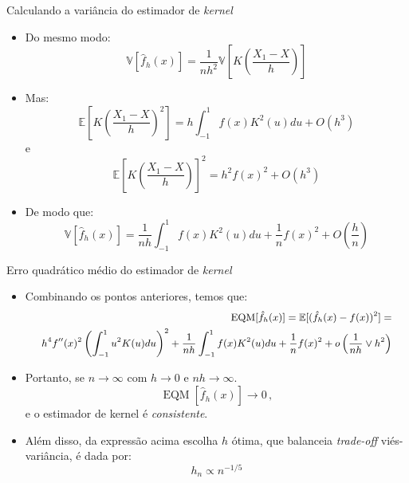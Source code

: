 \documentclass[11pt]{beamer}
\begin{document}
	\begin{frame}{Calculando a variância do estimador de \textit{kernel}}
		\begin{itemize}
			\item Do mesmo modo:
			$$		\mathbb{V}[\hat{f}_h(x)] = \frac{1}{nh^2}\mathbb{V}\left[K\left(\frac{X_1 - X}{h}\right)\right]$$
			\item Mas:
			$$\mathbb{E}\left[K\left(\frac{X_1 - X}{h}\right)^2\right] = h \int_{-1}^{1} f(x) K^2(u) du + O(h^3)$$
			e$$\mathbb{E}\left[K\left(\frac{X_1 - X}{h}\right)\right]^2 = h^2f(x)^2  + O(h^3)$$
			\item De modo que:
			$$\mathbb{V}[\hat{f}_h(x)] = \frac{1}{nh} \int_{-1}^{1} f(x) K^2(u) du+ \frac{1}{n}f(x)^2 + O\left(\frac{h}{n}\right)$$		
		\end{itemize}
		

	\end{frame}
	\begin{frame}{Erro quadrático médio do estimador de \textit{kernel}}
		\begin{itemize}
			\item Combinando os pontos anteriores, temos que:
			\begin{equation*}
				\small 
				\begin{aligned}
					\operatorname{EQM}[\hat{f}_h(x)] = \mathbb{E}[(\hat{f}_h(x) - f(x))^2] = \\ 
					h^4 f''(x)^2 \left(\int_{-1}^{1}u^2 K(u)du\right)^2 + \frac{1}{nh} \int_{-1}^{1} f(x) K^2(u) du+ \frac{1}{n}f(x)^2 + o\left(\frac{1}{nh} \lor h^2\right)
				\end{aligned}
			\end{equation*}
			\item Portanto, se $n \to \infty$ com $h\to 0$ e $nh \to \infty$.
			$$\operatorname{EQM}[\hat{f}_h(x)] \to 0\, ,$$
			e o estimador de kernel é \textit{consistente}.
			\item Além disso, da expressão acima escolha $h$ ótima, que balanceia \textit{trade-off} viés-variância,  é dada por:
			$$h_n \propto n^{-1/5} $$ 
			
		\end{itemize}
	\end{frame}
\end{document}
